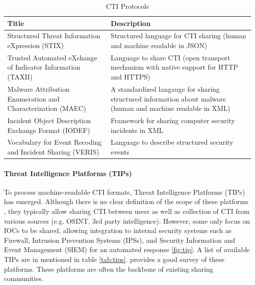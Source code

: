 \begin{table}[ht]
    \label{tab:cti-protocols}
    \centering
    \begin{tabular}{|p{} p{}|}
    \hline
    \textbf{Title} & \textbf{Description} \\
    \hline
    \hline
    Structured Threat Information eXpression (STIX) \cite{stix_documentation_2024} & Structured language for CTI sharing (human and machine readable in JSON) \\
    \hline
    Trusted Automated eXchange of Indicator Information (TAXII) \cite{stix_documentation_2024} & Language to share CTI (open transport mechanism with native support for HTTP and HTTPS) \\
    \hline
    Malware Attribution Enumeration and Characterization (MAEC) \cite{maec_project_documentation_2024} & A standardized langauge for sharing structured information about malware (human and machine readable in XML) \\
    \hline
    Incident Object Description Exchange Format (IODEF) \cite{kampanakis_incident_2017} & Framework for sharing computer security incidents in XML \\
    \hline
    Vocabulary for Event Recoding and Incident Sharing (VERIS) \cite{veris_framework} & Language to describe structured security events \\
    \hline
    \end{tabular}
    \caption{CTI Protocols \cite{wagner_cyber_2019}}
\end{table}

\paragraph{Threat Intelligence Platforms (TIPs)}
To process machine-readable CTI formats, Threat Intelligence Platforms (TIPs) has emerged. 
Although there is no clear definition of the scope of these platforms \cite{sauerwein_threat_2017}, they typically allow sharing CTI between users as well as collection of CTI from various sources (e.g. OSINT, 3rd party intelligence). However, some only focus on IOCs to be shared, allowing integration to internal security systems such as Firewall, Intrusion Prevention Systems (IPSs), and Security Information and Event Management (SIEM) for an automated response \ref{fig:tip}. A list of available TIPs are in mentioned in table \ref{tab:tips}. \cite{sauerwein_threat_2017} provides a good survey of these platforms.
These platforms are often the backbone of existing sharing communities.

